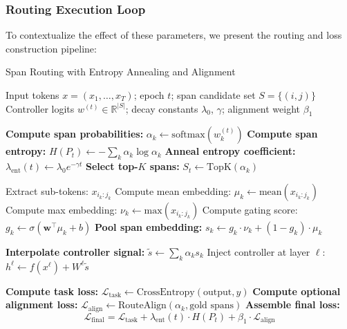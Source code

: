 \subsubsection*{Routing Execution Loop}

To contextualize the effect of these parameters, we present the routing and loss construction pipeline:

\begin{algorithm}[H]
\caption{Span Routing with Entropy Annealing and Alignment}
\label{alg:span_routing}
\begin{algorithmic}[1]
\REQUIRE Input tokens $x = (x_1, \dots, x_T)$; epoch $t$; span candidate set $S = \{(i, j)\}$
\REQUIRE Controller logits $w^{(t)} \in \mathbb{R}^{|S|}$; decay constants $\lambda_0$, $\gamma$; alignment weight $\beta_1$
\vspace{0.25em}

\STATE \textbf{Compute span probabilities:} $\alpha_k \gets \mathrm{softmax}(w_k^{(t)})$
\STATE \textbf{Compute span entropy:} $H(P_t) \gets -\sum_k \alpha_k \log \alpha_k$
\STATE \textbf{Anneal entropy coefficient:} $\lambda_{\mathrm{ent}}(t) \gets \lambda_0 e^{-\gamma t}$
\STATE \textbf{Select top-$K$ spans:} $S_t \gets \text{TopK}(\alpha_k)$

  \STATE Extract sub-tokens: $x_{i_k:j_k}$
  \STATE Compute mean embedding: $\mu_k \gets \mathrm{mean}(x_{i_k:j_k})$
  \STATE Compute max embedding: $\nu_k \gets \mathrm{max}(x_{i_k:j_k})$
  \STATE Compute gating score: $g_k \gets \sigma(\mathbf{w}^\top \mu_k + b)$
  \STATE \textbf{Pool span embedding:} $s_k \gets g_k \cdot \nu_k + (1 - g_k) \cdot \mu_k$
\ENDFOR

\STATE \textbf{Interpolate controller signal:} $\tilde{s} \gets \sum_k \alpha_k s_k$
\STATE Inject controller at layer $\ell$: $h^\ell \gets f(x^\ell) + W^\ell \tilde{s}$

\STATE \textbf{Compute task loss:} $\mathcal{L}_{\text{task}} \gets \text{CrossEntropy}(\text{output}, y)$
\STATE \textbf{Compute optional alignment loss:} $\mathcal{L}_{\text{align}} \gets \text{RouteAlign}(\alpha_k, \text{gold spans})$
\STATE \textbf{Assemble final loss:}
\begin{equation}
\mathcal{L}_{\text{final}} = \mathcal{L}_{\text{task}} + \lambda_{\mathrm{ent}}(t) \cdot H(P_t) + \beta_1 \cdot \mathcal{L}_{\text{align}}
\label{eq:final_loss}
\end{equation}
\end{algorithmic}
\end{algorithm}
